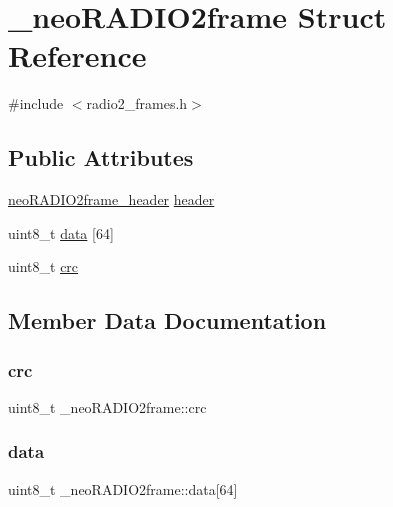 \hypertarget{struct__neo_r_a_d_i_o2frame}{}\section{\+\_\+neo\+R\+A\+D\+I\+O2frame Struct Reference}
\label{struct__neo_r_a_d_i_o2frame}


{\ttfamily \#include $<$radio2\+\_\+frames.\+h$>$}

\subsection*{Public Attributes}
\begin{DoxyCompactItemize}
\item 
\mbox{\hyperlink{radio2__frames_8h_a8998eb6f57354dabd898b6089c2e6f87}{neo\+R\+A\+D\+I\+O2frame\+\_\+header}} \mbox{\hyperlink{struct__neo_r_a_d_i_o2frame_a6d951e42651eb3cbd60431447b42c105}{header}}
\item 
uint8\+\_\+t \mbox{\hyperlink{struct__neo_r_a_d_i_o2frame_ac7c1cb19b09813c856a42726a7dae069}{data}} \mbox{[}64\mbox{]}
\item 
uint8\+\_\+t \mbox{\hyperlink{struct__neo_r_a_d_i_o2frame_aa1dde666e3e7c50491a2ba74b96439af}{crc}}
\end{DoxyCompactItemize}


\subsection{Member Data Documentation}
\mbox{\label{struct__neo_r_a_d_i_o2frame_aa1dde666e3e7c50491a2ba74b96439af}} 
\subsubsection{\texorpdfstring{crc}{crc}}
{\footnotesize\ttfamily uint8\+\_\+t \+\_\+neo\+R\+A\+D\+I\+O2frame\+::crc}

\mbox{\label{struct__neo_r_a_d_i_o2frame_ac7c1cb19b09813c856a42726a7dae069}} 
\subsubsection{\texorpdfstring{data}{data}}
{\footnotesize\ttfamily uint8\+\_\+t \+\_\+neo\+R\+A\+D\+I\+O2frame\+::data\mbox{[}64\mbox{]}}

